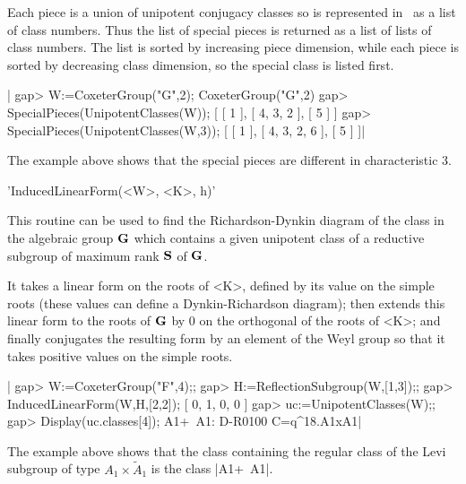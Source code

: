 Each  piece is a union of unipotent  conjugacy classes so is represented in
\CHEVIE\  as a list  of class numbers.  Thus the list  of special pieces is
returned  as  a  list  of  lists  of  class  numbers. The list is sorted by
increasing  piece dimension, while each piece is sorted by decreasing class
dimension, so the special class is listed first.

|    gap> W:=CoxeterGroup("G",2);
    CoxeterGroup("G",2)
    gap> SpecialPieces(UnipotentClasses(W));
    [ [ 1 ], [ 4, 3, 2 ], [ 5 ] ]
    gap> SpecialPieces(UnipotentClasses(W,3));
    [ [ 1 ], [ 4, 3, 2, 6 ], [ 5 ] ]|

The   example  above  shows  that  the  special  pieces  are  different  in
characteristic 3.


'InducedLinearForm(<W>, <K>, h)'

This routine can be used to find the Richardson-Dynkin diagram of the class
in  the algebraic group ${\bf G}$  which contains a given  unipotent class of a
reductive subgroup of maximum rank ${\bf S}$ of ${\bf G}$.

It  takes a linear  form on the  roots of <K>,  defined by its value on the
simple  roots (these values  can define a  Dynkin-Richardson diagram); then
extends  this linear form to the roots of ${\bf G}$ by $0$ on the orthogonal of
the  roots of <K>; and finally conjugates  the resulting form by an element
of the Weyl group so that it takes positive values on the simple roots.

|    gap> W:=CoxeterGroup("F",4);;
    gap> H:=ReflectionSubgroup(W,[1,3]);;
    gap> InducedLinearForm(W,H,[2,2]);
    [ 0, 1, 0, 0 ]
    gap> uc:=UnipotentClasses(W);;
    gap> Display(uc.classes[4]);
    A1+~A1: D-R0100 C=q^18.A1xA1|

The  example above shows that the class containing the regular class of the
Levi subgroup of type $A_1\times \tilde A_1$ is the class |A1+~A1|.
